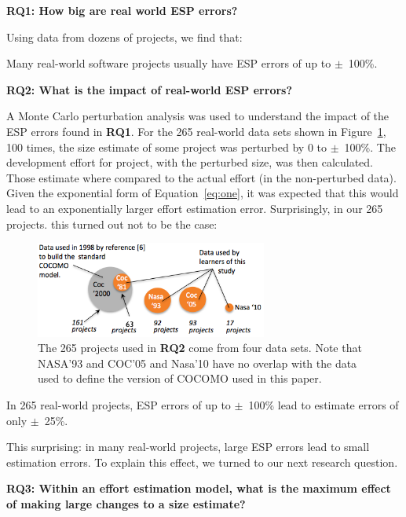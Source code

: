 \documentclass[final,twocolumn]{elsarticle}
\newcommand{\fig}[1]{Figure~\ref{fig:#1}}
\newcommand{\eq}[1]{Equation~\ref{eq:#1}}
\theoremstyle{break}
\begin{document}
{\bf RQ1: How big are real world ESP errors?}

Using data from dozens of projects, we find that:

\begin{lesson0}
  Many real-world software projects usually have ESP errors of up to $\pm$~100\%.
\end{lesson0}

{\bf RQ2: What is the impact of real-world ESP errors?}

A Monte Carlo perturbation analysis was used
to understand the impact of the ESP errors found in {\bf RQ1}.
For the 265 real-world data sets shown in \fig{dataused}, 100 times, the size estimate of some project was perturbed by
0 to $\pm$~100\%. The development effort
for project, with the perturbed size, was then calculated.
Those  estimate where  compared to the actual effort (in the non-perturbed data).
Given the exponential form of \eq{one}, it was expected that this would
lead to an exponentially larger effort estimation error. Surprisingly,
in our 265 projects.
this turned out not to be the case:

\begin{figure}[!t]
\begin{center}
\includegraphics[width=3in]{Figs/datasets1.png}
\end{center}
\caption{The 265 projects used in {\bf RQ2}
  come from four data sets.
   Note that NASA'93 and
COC'05 and Nasa'10 have no
overlap with the data used to define the version of COCOMO
used in this paper.}
\label{fig:dataused}
\end{figure}

\begin{lesson0}
  In 265 real-world projects,
  ESP errors of up to $\pm$~100\% lead to estimate errors of only $\pm$~25\%.
\end{lesson0}

This surprising: in many real-world projects, large ESP errors
lead to  small estimation errors.
To explain this effect, we turned to our next research question.

{\bf RQ3:
Within an effort estimation model, what is the maximum effect of making large changes to a size estimate?}
\end{document}
